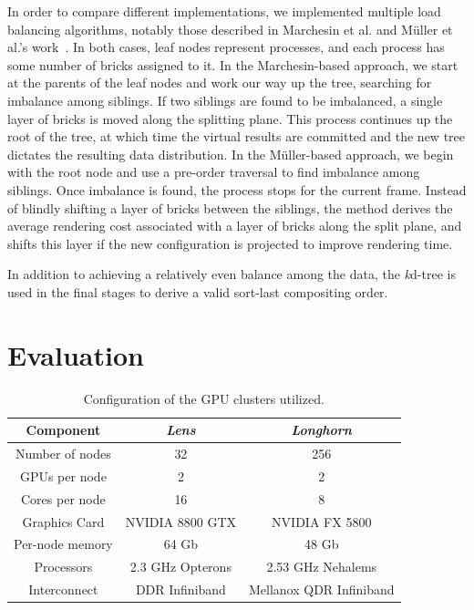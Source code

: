 In order to compare different implementations, we implemented multiple
load balancing algorithms, notably those described in Marchesin et al.
and M\"uller et al.'s work~\cite{Marchesin:2006:???, MSE06}.  In both cases, leaf
nodes represent processes, and each process has some number of bricks
assigned to it.  In the Marchesin-based approach, we start at the
parents of the leaf nodes and work our way up the tree, searching for
imbalance among siblings.  If two siblings are found to be imbalanced,
a single layer of bricks is moved along the splitting plane.  This
process continues up the root of the tree, at which time the virtual
results are committed and the new tree dictates the resulting data
distribution.  In the M\"uller-based approach, we begin with the root
node and use a pre-order traversal to find imbalance among siblings.
Once imbalance is found, the process stops for the current frame.
Instead of blindly shifting a layer of bricks between the siblings,
the method derives the average rendering cost associated with a layer
of bricks along the split plane, and shifts this layer if the new
configuration is projected to improve rendering time.

In addition to achieving a relatively even balance among the data, the
\emph{k}d-tree is used in the final stages to derive a valid sort-last
compositing order.

\section{Evaluation}
\label{sec:eval}

\begin{table}
	\begin{tabular}{|c|c|c|}\hline
	\textbf{Component} & \textit{Lens} & \textit{Longhorn}\\\hline
	Number of nodes & 32 & 256\\\hline
	GPUs per node & 2 & 2\\\hline
	Cores per node & 16 & 8\\\hline
	Graphics Card & NVIDIA 8800 GTX & NVIDIA FX 5800\\\hline
	Per-node memory & 64 Gb & 48 Gb\\\hline
	Processors & 2.3 GHz Opterons & 2.53 GHz Nehalems\\\hline
	Interconnect & DDR Infiniband & Mellanox QDR Infiniband\\\hline
	\end{tabular}
	\caption{Configuration of the GPU clusters utilized.}
	\label{tbl:clusters}
\end{table}

